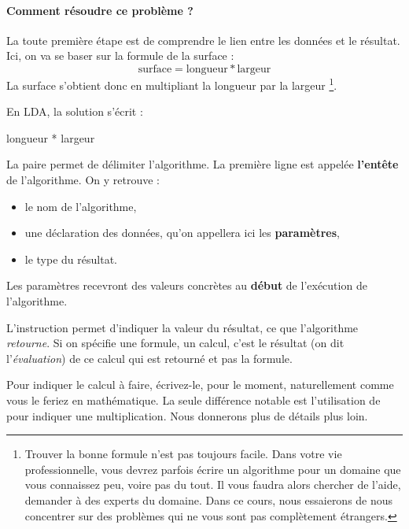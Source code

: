 			\paragraph{Comment résoudre ce problème ?} 
			La toute première étape est de comprendre 
			le lien entre les données et le résultat. 
			Ici, on va se baser sur la formule de la surface :
			\[
				\textrm{surface} = \textrm{longueur} * \textrm{largeur}
			\]
			La surface s'obtient donc en multipliant la longueur par la largeur%
			\footnote{%
				Trouver la bonne formule n'est pas toujours facile.
				Dans votre vie professionnelle, 
				vous devrez parfois écrire un algorithme
				pour un domaine que vous connaissez peu,
				voire pas du tout.
				Il vous faudra alors chercher de l'aide,
				demander à des experts du domaine.
				Dans ce cours,
				nous essaierons de nous concentrer sur des problèmes
				qui ne vous sont pas complètement étrangers.
			}.
			
			En LDA, la solution s'écrit :
			
			\begin{LDA}
					\Return longueur * largeur
				\EndAlgo
			\end{LDA}
		
			La paire \lda{\algorithmicalgo-\algorithmicend\ \algorithmicalgo}
			permet de délimiter l'algorithme.
			La première ligne est appelée 
			\textbf{l'entête} de l'algorithme.
			On y retrouve :
			\begin{itemize}
				\item 
					le nom de l'algorithme,
				\item 
					une déclaration des données, 
					qu’on appellera ici les \textbf{paramètres}, 
				\item 
					le type du résultat.
			\end{itemize}
		
			Les paramètres recevront des valeurs concrètes
			au \textbf{début} de l’exécution de l'algorithme. 
		
			L'instruction \lda{\algorithmicreturn}
			permet d'indiquer la valeur du résultat, 
			ce que l'algorithme \emph{retourne}.
			Si on spécifie une formule, un calcul,
			c'est le résultat (on dit l'\emph{évaluation}) 
			de ce calcul qui est retourné et pas la formule.
		
			Pour indiquer le calcul à faire,
			écrivez-le, pour le moment,
			naturellement comme vous le feriez en mathématique.
			La seule différence notable est l'utilisation de \lda{*}
			pour indiquer une multiplication.
			Nous donnerons plus de détails plus loin.
	
